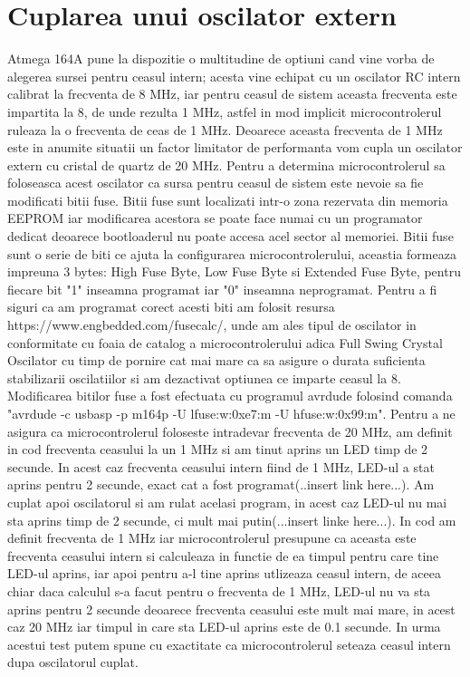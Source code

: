 \documentclass[12pt]{article}
\begin{document}
\section{Cuplarea unui oscilator extern}
\hspace{8 mm} Atmega 164A pune la dispozitie o multitudine de optiuni cand vine vorba de alegerea sursei pentru ceasul intern; acesta vine echipat cu un oscilator RC intern calibrat la frecventa de 8 MHz, iar pentru ceasul de sistem aceasta frecventa este impartita la 8, de unde rezulta 1 MHz, astfel in mod implicit microcontrolerul ruleaza la o frecventa de ceas de 1 MHz. Deoarece aceasta frecventa de 1 MHz este in anumite situatii un factor limitator de performanta vom cupla un oscilator extern cu cristal de quartz de 20 MHz. Pentru a determina microcontrolerul sa foloseasca acest oscilator ca sursa pentru ceasul de sistem este nevoie sa fie modificati bitii fuse. Bitii fuse sunt localizati intr-o zona rezervata din memoria EEPROM iar modificarea acestora se poate face numai cu un programator dedicat deoarece bootloaderul nu poate accesa acel sector al memoriei. Bitii fuse sunt o serie de biti ce ajuta la configurarea microcontrolerului, aceastia formeaza impreuna 3 bytes: High Fuse Byte, Low Fuse Byte si Extended Fuse Byte, pentru fiecare bit "1" inseamna programat iar "0" inseamna neprogramat. Pentru a fi siguri ca am programat corect acesti biti am folosit resursa https://www.engbedded.com/fusecalc/, unde am ales tipul de oscilator in conformitate cu foaia de catalog a microcontrolerului adica Full Swing Crystal Oscilator cu timp de pornire cat mai mare ca sa asigure o durata suficienta stabilizarii oscilatiilor si am dezactivat optiunea ce imparte ceasul la 8. Modificarea bitilor fuse a fost efectuata cu programul avrdude folosind comanda "avrdude -c usbasp -p m164p -U lfuse:w:0xe7:m -U hfuse:w:0x99:m". Pentru a ne asigura ca microcontrolerul foloseste intradevar frecventa de 20 MHz, am definit in cod frecventa ceasului la un 1 MHz si am tinut aprins un LED timp de 2 secunde. In acest caz frecventa ceasului intern fiind de 1 MHz, LED-ul a stat aprins pentru 2 secunde, exact cat a fost programat(..insert link here...). Am cuplat apoi oscilatorul si am rulat acelasi program, in acest caz LED-ul nu mai sta aprins timp de 2 secunde, ci mult mai putin(...insert linke here...). In cod am definit frecventa de 1 MHz iar microcontrolerul presupune ca aceasta este frecventa ceasului intern si calculeaza in functie de ea timpul pentru care tine LED-ul aprins, iar apoi pentru a-l tine aprins utlizeaza ceasul intern, de aceea chiar daca calculul s-a facut pentru o frecventa de 1 MHz, LED-ul nu va sta aprins pentru 2 secunde deoarece frecventa ceasului este mult mai mare, in acest caz 20 MHz iar timpul in care sta LED-ul aprins este de 0.1 secunde. In urma acestui test putem spune cu exactitate ca microcontrolerul seteaza ceasul intern dupa oscilatorul cuplat.
\end{document}
